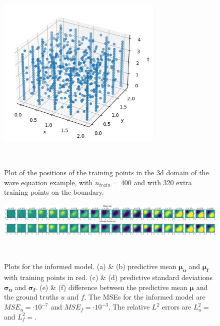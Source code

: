 \documentclass{article}
\begin{document}
\begin{figure}
    \centering
    \includegraphics[width=0.7\textwidth]{../final_examples/wave_equation/training_points.png}
    \caption{Plot of the positions of the training points in the 3d domain of the wave equation example, with $n_{train}$ = 400 and with 320 extra training points on the boundary.}
    ~\label{fig:training_points_wave}
\end{figure}

\begin{figure}
    \centering
    \includegraphics[width=1\textwidth]{../final_examples/wave_equation/wave_3d.png}
    \caption{Plots for the informed model. (a) \& (b) predictive mean $\bm{\mu_u}$ and $\bm{\mu_f}$ with training points in red. (c) \& (d) predictive standard deviations $\bm{\sigma_u}$ and $\bm{\sigma_f}$. (e) \& (f) difference between the predictive mean $\bm{\mu}$ and the ground truths $u$ and $f$. The MSEs for the informed model are $MSE_u =  \cdot 10^{-7}$ and $MSE_f =  \cdot 10^{-3}$. The relative $L^2$ errors are $L^2_u = $ and $L^2_f = $.}
    ~\label{fig:wave}
\end{figure}
\end{document}
